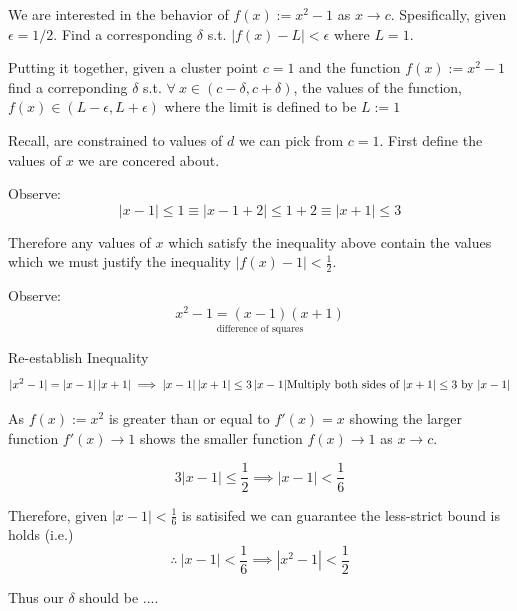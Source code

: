 We are interested in the behavior of $f(x) := x^2-1$ as $x \rightarrow c$.  Spesifically, given $\epsilon = 1/2$. Find a corresponding $\delta$ s.t. $|f(x)-L| < \epsilon$ where $L=1$.

Putting it together, given a cluster point $c=1$ and the function $f(x):= x^2-1$ find a correponding $\delta$ s.t. $\forall~ x \in (c-\delta, c+\delta)$, the values of the function, $f(x) \in (L-\epsilon, L+\epsilon)$ where the limit is defined to be $L := 1$


Recall, are constrained to values of $d$ we can pick from $c=1$. First define the values of $x$ we are concered about.

Observe:
\[
	|x-1| \leq 1 \equiv  |x-1+2| \leq 1+2 \equiv |x+1| \leq 3
\]

Therefore any values of $x$ which satisfy the inequality above contain the values which we must justify the inequality $|f(x) - 1| < \frac{1}{2}$.

Observe:
\[
	\underset{\text{ difference of squares }}{x^2 - 1 = (x-1)(x+1)}
\]

Re-establish Inequality
\[
	|x^2 - 1| = |x - 1|\,|x + 1| \implies |x - 1|\,|x + 1| \leq 3\,|x - 1| \\
	\text{Multiply both sides of $|x+1| \leq 3$ by $|x-1|$}
\]

As $f(x) := x^2$ is greater than or equal to $f'(x) = x$ showing the larger function $f'(x) \rightarrow 1$ shows the smaller function $f(x) \rightarrow 1$ as $x \rightarrow c$.

\[
	3|x-1| \leq \frac{1}{2} \implies |x-1| < \frac{1}{6}
\]


Therefore, given $|x-1| <\frac{1}{6}$ is satisifed we can guarantee the less-strict bound is holds (i.e.)
\[
	\therefore ~|x-1| < \frac{1}{6} \implies |x^2-1| < \frac{1}{2}
\]

Thus our $\delta$ should be ....


